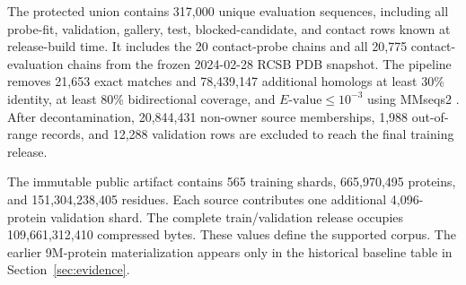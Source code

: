 \documentclass{article}
\begin{document}
\begin{table}[H]
  \centering
  \scriptsize
  \setlength{\tabcolsep}{3.0pt}
  \caption{The single corpus funnel. Source-view distinct counts can overlap
  because one exact sequence may carry more than one source membership.
  Cross-source ownership is resolved before the final training count.}
  \label{tab:data-funnel}
\end{table}

The protected union contains 317,000 unique evaluation sequences, including
all probe-fit, validation, gallery, test, blocked-candidate, and contact rows
known at release-build time. It includes the 20 contact-probe chains and all
20,775 contact-evaluation chains from the frozen 2024-02-28 RCSB PDB snapshot.
The pipeline removes 21,653 exact matches and 78,439,147 additional homologs
at least 30\% identity, at least 80\% bidirectional coverage, and
$E\text{-value}\leq10^{-3}$ using MMseqs2 \citep{steinegger2017mmseqs2}.
After decontamination, 20,844,431 non-owner source memberships, 1,988
out-of-range records, and 12,288 validation rows are excluded to reach the
final training release.

The immutable public artifact contains 565 training shards,
665,970,495 proteins, and 151,304,238,405 residues. Each source contributes
one additional 4,096-protein validation shard. The complete train/validation
release occupies 109,661,312,410 compressed bytes. These values define the
supported corpus. The earlier 9M-protein materialization appears only in the
historical baseline table in Section~\ref{sec:evidence}.
\end{document}
